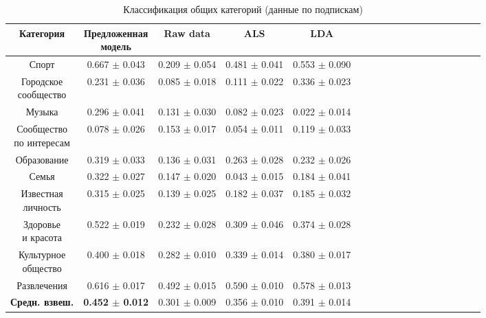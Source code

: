 \documentclass[times,specification,annotation]{itmo-student-thesis}
\begin{document}
\begin{table}[!h]
\caption{Классификация общих категорий (данные по подпискам)}\label{tab-subs-g}
\centering
\begin{tabular}{|*{18}{c|}}\hline
Категория & \thead{Предложенная \\  модель}  & Raw data & ALS & LDA \\\hline
Спорт        							& 0.667 $\pm$ 0.043 & 0.209 $\pm$ 0.054 & 0.481 $\pm$ 0.041 & 0.553 $\pm$ 0.090 \\\hline
\thead{Городское \\ сообщество}
                                      		& 0.231 $\pm$ 0.036 & 0.085 $\pm$ 0.018 & 0.111 $\pm$ 0.022 & 0.336 $\pm$ 0.023  \\\hline
Музыка         				    	& 0.296 $\pm$ 0.041 & 0.131 $\pm$ 0.030 & 0.082 $\pm$ 0.023 & 0.022 $\pm$ 0.014  \\\hline
\thead{Сообщество \\ по интересам}
         									& 0.078 $\pm$ 0.026 & 0.153 $\pm$ 0.017 & 0.054 $\pm$ 0.011 & 0.119 $\pm$ 0.033  \\\hline
Образование              		& 0.319 $\pm$ 0.033 & 0.136 $\pm$ 0.031 & 0.263 $\pm$ 0.028 & 0.232 $\pm$ 0.026  \\\hline
Семья  								& 0.322 $\pm$ 0.027 & 0.147 $\pm$ 0.020 & 0.043 $\pm$ 0.015 & 0.184 $\pm$ 0.041  \\\hline
\thead{Известная \\ личность}
         							    	& 0.315 $\pm$ 0.025 & 0.139 $\pm$ 0.025 & 0.182 $\pm$ 0.037 & 0.185 $\pm$ 0.032   \\\hline
\thead{Здоровье \\ и красота}
               							    & 0.522 $\pm$ 0.019 & 0.232 $\pm$ 0.028 & 0.309 $\pm$ 0.046 & 0.374 $\pm$ 0.028  \\\hline
\thead{Культурное \\ общество}
           									& 0.400 $\pm$ 0.018 & 0.282 $\pm$ 0.010 & 0.339 $\pm$ 0.014 & 0.380 $\pm$ 0.017  \\\hline
Развлечения           			& 0.616 $\pm$ 0.017 & 0.492 $\pm$ 0.015 & 0.590 $\pm$ 0.010 & 0.578 $\pm$ 0.013  \\\hline
\textbf{Средн. взвеш.}& \textbf{0.452 $\pm$ 0.012} & 0.301 $\pm$ 0.009 & 0.356 $\pm$ 0.010 & 0.391 $\pm$ 0.014  \\\hline
\end{tabular}
\end{table}
\end{document}

